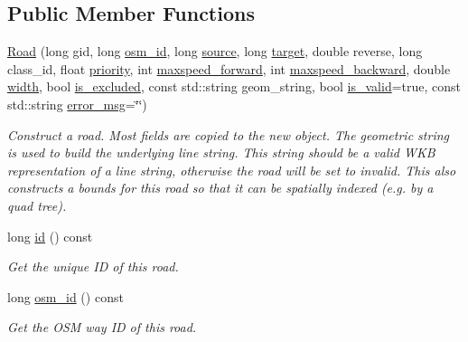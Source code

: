 \subsection*{Public Member Functions}
\begin{DoxyCompactItemize}
\item 
\hyperlink{classgeo_1_1Road_a85b7e3e89e52e842bfa15e5404fe4a9e}{Road} (long gid, long \hyperlink{classgeo_1_1Road_a79fa381411ec36822a72b18bdc0fb208}{osm\+\_\+id}, long \hyperlink{classgeo_1_1Road_aeb43e9d82bbcab6a14a34abb749c4315}{source}, long \hyperlink{classgeo_1_1Road_adc5ce304928ae25948a4e4d96f239751}{target}, double reverse, long class\+\_\+id, float \hyperlink{classgeo_1_1Road_a24e121011f2b204e1d591c6a4f886380}{priority}, int \hyperlink{classgeo_1_1Road_a08506729380f0ec23720cffd27ea3d16}{maxspeed\+\_\+forward}, int \hyperlink{classgeo_1_1Road_a4278e486912e378390de155ca0bb2fc9}{maxspeed\+\_\+backward}, double \hyperlink{classgeo_1_1Road_ad102794fac433fc684647827d79f0aeb}{width}, bool \hyperlink{classgeo_1_1Road_afdc7c8bacdac2e5976bf29a0e9ee5ce2}{is\+\_\+excluded}, const std\+::string geom\+\_\+string, bool \hyperlink{classgeo_1_1Road_a63163ca614d9d01b3e15bf06a0901ddb}{is\+\_\+valid}=true, const std\+::string \hyperlink{classgeo_1_1Road_a32af3119496e802b14d9b1e3529b139b}{error\+\_\+msg}=\char`\"{}\char`\"{})
\begin{DoxyCompactList}\small\item\em Construct a road. Most fields are copied to the new object. The geometric string is used to build the underlying line string. This string should be a valid W\+KB representation of a line string, otherwise the road will be set to invalid. This also constructs a bounds for this road so that it can be spatially indexed (e.\+g. by a quad tree). \end{DoxyCompactList}\item 
long \hyperlink{classgeo_1_1Road_a2461a5c785065220b6036f9e2e6646ff}{id} () const 
\begin{DoxyCompactList}\small\item\em Get the unique ID of this road. \end{DoxyCompactList}\item 
long \hyperlink{classgeo_1_1Road_a79fa381411ec36822a72b18bdc0fb208}{osm\+\_\+id} () const 
\begin{DoxyCompactList}\small\item\em Get the O\+SM way ID of this road. \end{DoxyCompactList}\item 

\end{DoxyCompactItemize}
